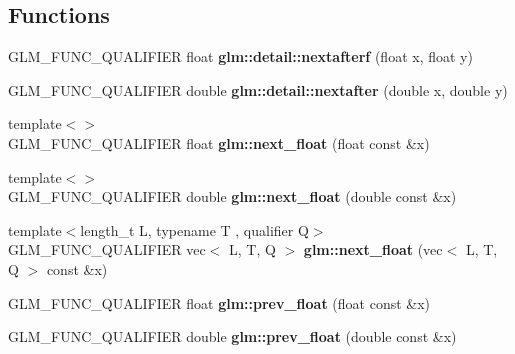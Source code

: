 \subsection*{Functions}
\begin{DoxyCompactItemize}
\item 
\mbox{\label{ulp_8inl_ab0eb795c482130b1d6c83470bdb031e6}} 
G\+L\+M\+\_\+\+F\+U\+N\+C\+\_\+\+Q\+U\+A\+L\+I\+F\+I\+ER float {\bfseries glm\+::detail\+::nextafterf} (float x, float y)
\item 
\mbox{\label{ulp_8inl_a3c14f8400407e8b4cff5be12ceef2c1e}} 
G\+L\+M\+\_\+\+F\+U\+N\+C\+\_\+\+Q\+U\+A\+L\+I\+F\+I\+ER double {\bfseries glm\+::detail\+::nextafter} (double x, double y)
\item 
\mbox{\label{ulp_8inl_a094d145a4ae8efb9e42e88883cfb15f1}} 
{\footnotesize template$<$$>$ }\\G\+L\+M\+\_\+\+F\+U\+N\+C\+\_\+\+Q\+U\+A\+L\+I\+F\+I\+ER float {\bfseries glm\+::next\+\_\+float} (float const \&x)
\item 
\mbox{\label{ulp_8inl_a451149113e1a5083fcba0546de81ad51}} 
{\footnotesize template$<$$>$ }\\G\+L\+M\+\_\+\+F\+U\+N\+C\+\_\+\+Q\+U\+A\+L\+I\+F\+I\+ER double {\bfseries glm\+::next\+\_\+float} (double const \&x)
\item 
\mbox{\label{ulp_8inl_a7aa4738ac943cea90328c262537c6914}} 
{\footnotesize template$<$length\+\_\+t L, typename T , qualifier Q$>$ }\\G\+L\+M\+\_\+\+F\+U\+N\+C\+\_\+\+Q\+U\+A\+L\+I\+F\+I\+ER vec$<$ L, T, Q $>$ {\bfseries glm\+::next\+\_\+float} (vec$<$ L, T, Q $>$ const \&x)
\item 
\mbox{\label{ulp_8inl_a1fd407652d7ccfbe810674a2e5cbc8eb}} 
G\+L\+M\+\_\+\+F\+U\+N\+C\+\_\+\+Q\+U\+A\+L\+I\+F\+I\+ER float {\bfseries glm\+::prev\+\_\+float} (float const \&x)
\item 
\mbox{\label{ulp_8inl_a82cdd5674b80569f118b33a6a327c9bd}} 
G\+L\+M\+\_\+\+F\+U\+N\+C\+\_\+\+Q\+U\+A\+L\+I\+F\+I\+ER double {\bfseries glm\+::prev\+\_\+float} (double const \&x)
\item 
\mbox{\label{ulp_8inl_a7269234e5e58024e74a177fee5e42286}} 

\end{DoxyCompactItemize}
